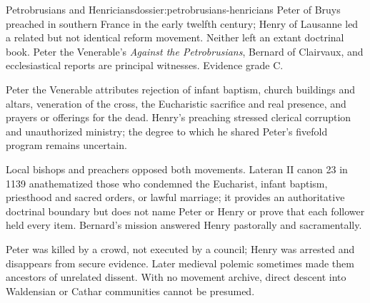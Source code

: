\begin{heresydossier}{Petrobrusians and Henricians}{dossier:petrobrusians-henricians}
\objectfield Peter of Bruys preached in southern France in the early twelfth century; Henry of Lausanne led a related but not identical reform movement. Neither left an extant doctrinal book. Peter the Venerable's \emph{Against the Petrobrusians}, Bernard of Clairvaux, and ecclesiastical reports are principal witnesses. Evidence grade C.

\propositionfield Peter the Venerable attributes rejection of infant baptism, church buildings and altars, veneration of the cross, the Eucharistic sacrifice and real presence, and prayers or offerings for the dead. Henry's preaching stressed clerical corruption and unauthorized ministry; the degree to which he shared Peter's fivefold program remains uncertain.

\responsefield Local bishops and preachers opposed both movements. Lateran II canon 23 in 1139 anathematized those who condemned the Eucharist, infant baptism, priesthood and sacred orders, or lawful marriage; it provides an authoritative doctrinal boundary but does not name Peter or Henry or prove that each follower held every item. Bernard's mission answered Henry pastorally and sacramentally.

\aftermathfield Peter was killed by a crowd, not executed by a council; Henry was arrested and disappears from secure evidence. Later medieval polemic sometimes made them ancestors of unrelated dissent. With no movement archive, direct descent into Waldensian or Cathar communities cannot be presumed.
\end{heresydossier}

